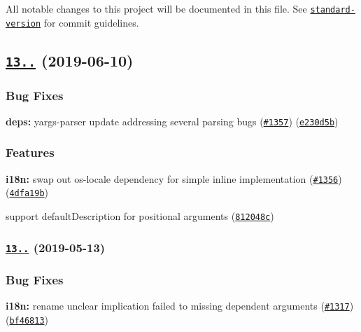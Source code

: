 All notable changes to this project will be documented in this file. See \href{https://github.com/conventional-changelog/standard-version}{\tt standard-\/version} for commit guidelines.

\subsection*{\href{https://www.github.com/yargs/yargs/compare/v13.2.4...v13.3.0}{\tt 13..} (2019-\/06-\/10)}

\subsubsection*{Bug Fixes}


\begin{DoxyItemize}
\item {\bfseries deps\+:} yargs-\/parser update addressing several parsing bugs (\href{https://www.github.com/yargs/yargs/issues/1357}{\tt \#1357}) (\href{https://www.github.com/yargs/yargs/commit/e230d5b}{\tt e230d5b})
\end{DoxyItemize}

\subsubsection*{Features}


\begin{DoxyItemize}
\item {\bfseries i18n\+:} swap out os-\/locale dependency for simple inline implementation (\href{https://www.github.com/yargs/yargs/issues/1356}{\tt \#1356}) (\href{https://www.github.com/yargs/yargs/commit/4dfa19b}{\tt 4dfa19b})
\item support default\+Description for positional arguments (\href{https://www.github.com/yargs/yargs/commit/812048c}{\tt 812048c})
\end{DoxyItemize}

\subsubsection*{\href{https://github.com/yargs/yargs/compare/v13.2.3...v13.2.4}{\tt 13..} (2019-\/05-\/13)}

\subsubsection*{Bug Fixes}


\begin{DoxyItemize}
\item {\bfseries i18n\+:} rename unclear \textquotesingle{}implication failed\textquotesingle{} to \textquotesingle{}missing dependent arguments\textquotesingle{} (\href{https://github.com/yargs/yargs/issues/1317}{\tt \#1317}) (\href{https://github.com/yargs/yargs/commit/bf46813}{\tt bf46813})
\end{DoxyItemize}

